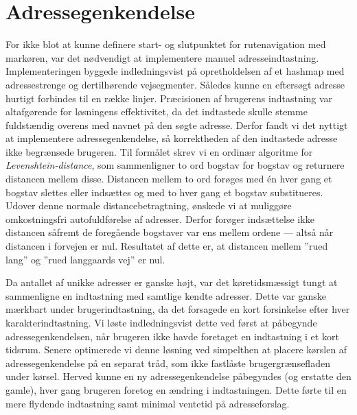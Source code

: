 \section{Adressegenkendelse}
For ikke blot at kunne definere start- og slutpunktet for rutenavigation med markøren, var det nødvendigt at implementere manuel adresseindtastning. Implementeringen byggede indledningsvist på opretholdelsen af et hashmap med adressestrenge og dertilhørende vejsegmenter. Således kunne en eftersøgt adresse hurtigt forbindes til en række linjer. Præcisionen af brugerens indtastning var altafgørende for løsningens effektivitet, da det indtastede skulle stemme fuldstændig overens med navnet på den søgte adresse. Derfor fandt vi det nyttigt at implementere adressegenkendelse, så korrektheden af den indtastede adresse ikke begrænsede brugeren. Til formålet skrev vi en ordinær algoritme for \emph{Levenshtein-distance}, som sammenligner to ord bogstav for bogstav og returnere distancen mellem disse. Distancen mellem to ord forøges med én hver gang et bogstav slettes eller indsættes og med to hver gang et bogstav substitueres. Udover denne normale distancebetragtning, ønskede vi at muliggøre omkostningsfri autofuldførelse af adresser. Derfor forøger indsættelse ikke distancen såfremt de foregående bogstaver var ens mellem ordene --- altså når distancen i forvejen er nul. Resultatet af dette er, at distancen mellem ''rued lang'' og ''rued langgaards vej'' er nul.

Da antallet af unikke adresser er ganske højt, var det køretidsmæssigt tungt at sammenligne en indtastning med samtlige kendte adresser. Dette var ganske mærkbart under brugerindtastning, da det forsagede en kort forsinkelse efter hver karakterindtastning. Vi løste indledningsvist dette ved først at påbegynde adressegenkendelsen, når brugeren ikke havde foretaget en indtastning i et kort tidsrum. Senere optimerede vi denne løsning ved simpelthen at placere kørslen af adressegenkendelse på en separat tråd, som ikke fastlåste brugergrænsefladen under kørsel. Herved kunne en ny adressegenkendelse påbegyndes (og erstatte den gamle), hver gang brugeren foretog en ændring i indtastningen. Dette førte til en mere flydende indtastning samt minimal ventetid på adresseforslag.